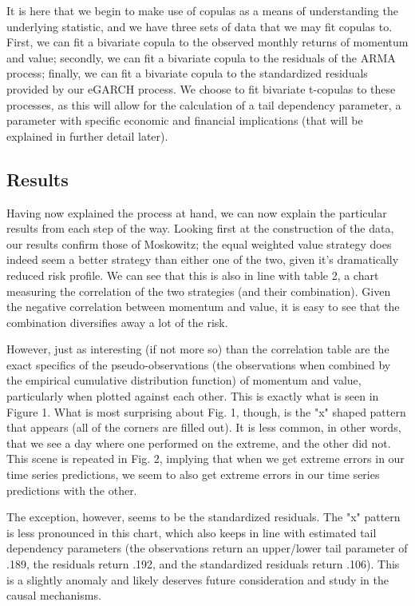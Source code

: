 \documentclass[12pt,letterpaper]{memoir}
\begin{document}
It is here that we begin to make use of copulas as a means of understanding the underlying statistic, and we have three sets of data that we may fit copulas to. First, we can fit a bivariate copula to the observed monthly returns of momentum and value; secondly, we can fit a bivariate copula to the residuals of the ARMA process; finally, we can fit a bivariate copula to the standardized residuals provided by our eGARCH process. We choose to fit bivariate t-copulas to these processes, as this will allow for the calculation of a tail dependency parameter, a parameter with specific economic and financial implications (that will be explained in further detail later).
\subsection*{Results}
Having now explained the process at hand, we can now explain the particular results from each step of the way. Looking first at the construction of the data, our results confirm those of Moskowitz; the equal weighted value strategy does indeed seem a better strategy than either one of the two, given it's dramatically reduced risk profile. We can see that this is also in line with table 2, a chart measuring the correlation of the two strategies (and their combination). Given the negative correlation between momentum and value, it is easy to see that the combination diversifies away a lot of the risk.

However, just as interesting (if not more so) than the correlation table are the exact specifics of the pseudo-observations (the observations when combined by the empirical cumulative distribution function) of momentum and value, particularly when plotted against each other. This is exactly what is seen in Figure 1. What is most surprising about Fig. 1, though, is the "x" shaped pattern that appears (all of the corners are filled out). It is less common, in other words, that we see a day where one performed on the extreme, and the other did not. This scene is repeated in Fig. 2, implying that when we get extreme errors in our time series predictions, we seem to also get extreme errors in our time series predictions with the other.

The exception, however, seems to be the standardized residuals. The "x" pattern is less pronounced in this chart, which also keeps in line with estimated tail dependency parameters (the observations return an upper/lower tail parameter of .189, the residuals return .192, and the standardized residuals return .106). This is a slightly anomaly and likely deserves future consideration and study in the causal mechanisms.
\end{document}
